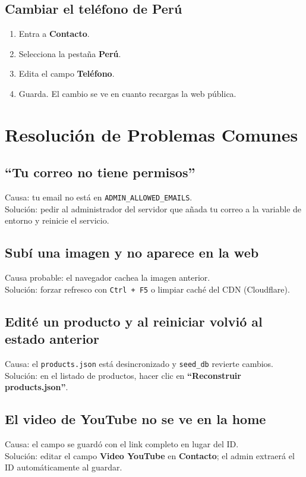 \documentclass[11pt,a4paper]{article}
\begin{document}
\subsection{Cambiar el teléfono de Perú}
\begin{enumerate}[leftmargin=*]
    \item Entra a \textbf{Contacto}.
    \item Selecciona la pestaña \textbf{Perú}.
    \item Edita el campo \textbf{Teléfono}.
    \item Guarda. El cambio se ve en cuanto recargas la web pública.
\end{enumerate}

\section{Resolución de Problemas Comunes}

\subsection{``Tu correo no tiene permisos''}
Causa: tu email no está en \texttt{ADMIN\_ALLOWED\_EMAILS}.\\
Solución: pedir al administrador del servidor que añada tu correo a la
variable de entorno y reinicie el servicio.

\subsection{Subí una imagen y no aparece en la web}
Causa probable: el navegador cachea la imagen anterior.\\
Solución: forzar refresco con \texttt{Ctrl + F5} o limpiar caché del CDN
(Cloudflare).

\subsection{Edité un producto y al reiniciar volvió al estado anterior}
Causa: el \texttt{products.json} está desincronizado y \texttt{seed\_db}
revierte cambios.\\
Solución: en el listado de productos, hacer clic en
\textbf{``Reconstruir products.json''}.

\subsection{El video de YouTube no se ve en la home}
Causa: el campo se guardó con el link completo en lugar del ID.\\
Solución: editar el campo \textbf{Video YouTube} en \textbf{Contacto}; el
admin extraerá el ID automáticamente al guardar.
\end{document}
